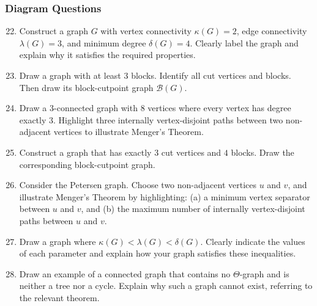\documentclass{article}
\theoremstyle{definition}
\begin{document}
\subsubsection{Diagram Questions}
\begin{enumerate}\setcounter{enumi}{21}
\item Construct a graph $G$ with vertex connectivity $\kappa(G) = 2$, edge connectivity $\lambda(G) = 3$, and minimum degree $\delta(G) = 4$. Clearly label the graph and explain why it satisfies the required properties.

\item Draw a graph with at least 3 blocks. Identify all cut vertices and blocks. Then draw its block-cutpoint graph $\mathcal{B}(G)$.

\item Draw a $3$-connected graph with $8$ vertices where every vertex has degree exactly $3$. Highlight three internally vertex-disjoint paths between two non-adjacent vertices to illustrate Menger's Theorem.

\item Construct a graph that has exactly $3$ cut vertices and $4$ blocks. Draw the corresponding block-cutpoint graph.

\item Consider the Petersen graph. Choose two non-adjacent vertices $u$ and $v$, and illustrate Menger's Theorem by highlighting: (a) a minimum vertex separator between $u$ and $v$, and (b) the maximum number of internally vertex-disjoint paths between $u$ and $v$.

\item Draw a graph where $\kappa(G) < \lambda(G) < \delta(G)$. Clearly indicate the values of each parameter and explain how your graph satisfies these inequalities.

\item Draw an example of a connected graph that contains no $\Theta$-graph and is neither a tree nor a cycle. Explain why such a graph cannot exist, referring to the relevant theorem.
\end{enumerate}
\end{document}
